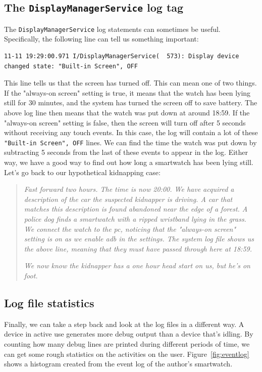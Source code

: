 \documentclass[a4paper,11pt,dvips]{article}
\begin{document}
\subsection{The \texttt{DisplayManagerService} log tag}

The \texttt{DisplayManagerService} log statements can sometimes be useful. Specifically, the following line can tell us something important:

\scriptsize
\begin{verbatim}
11-11 19:29:00.971 I/DisplayManagerService(  573): Display device changed state: "Built-in Screen", OFF
\end{verbatim}
\normalsize

\noindent
This line tells us that the screen has turned off. This can mean one of two things. If the "always-on screen" setting is true, it means that the watch has been lying still for 30 minutes, and the system has turned the screen off to save battery. The above log line then means that the watch was put down at around 18:59. If the "always-on screen" setting is false, then the screen will turn off after 5 seconds without receiving any touch events. In this case, the log will contain a lot of these \texttt{"Built-in Screen", OFF} lines. We can find the time the watch was put down by subtracting 5 seconds from the last of these events to appear in the log. Either way, we have a good way to find out how long a smartwatch has been lying still. Let's go back to our hypothetical kidnapping case:

\begin{quote}
\textit{Fast forward two hours. The time is now 20:00. We have acquired a description of the car the suspected kidnapper is driving. A car that matches this description is found abandoned near the edge of a forest. A police dog finds a smartwatch with a ripped wristband lying in the grass. We connect the watch to the pc, noticing that the "always-on screen" setting is on as we enable adb in the settings. The system log file shows us the above line, meaning that they must have passed through here at 18:59.}

\textit{We now know the kidnapper has a one hour head start on us, but he's on foot.}
\end{quote}


\subsection{Log file statistics}

Finally, we can take a step back and look at the log files in a different way. A device in active use generates more debug output than a device that's idling. By counting how many debug lines are printed during different periods of time, we can get some rough statistics on the activities on the user. Figure~\ref{fig:eventlog} shows a histogram created from the event log of the author's smartwatch.
\end{document}

